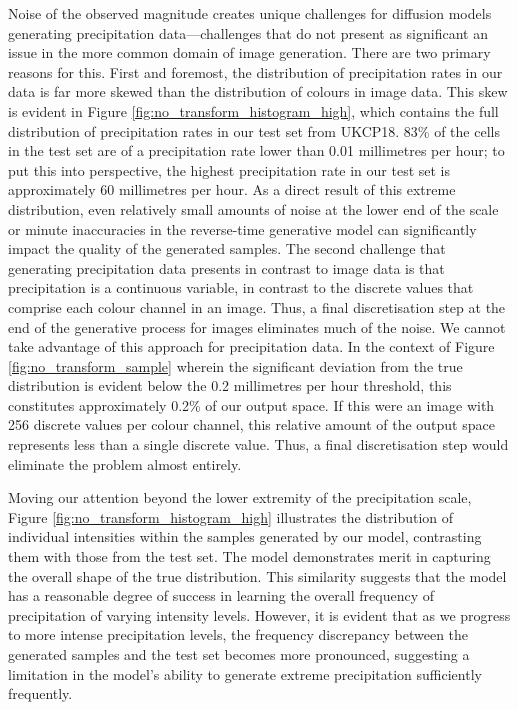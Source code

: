 \documentclass[ oneside,%
                    author={George Herbert},
                    degree={MSci},
                     title={Video Diffusion Models for Climate Simulations},
                  subtitle={}]{dissertation}
\begin{document}
Noise of the observed magnitude creates unique challenges for diffusion models generating precipitation data---challenges that do not present as significant an issue in the more common domain of image generation. There are two primary reasons for this. First and foremost, the distribution of precipitation rates in our data is far more skewed than the distribution of colours in image data. This skew is evident in Figure \ref{fig:no_transform_histogram_high}, which contains the full distribution of precipitation rates in our test set from UKCP18. 83\% of the cells in the test set are of a precipitation rate lower than 0.01 millimetres per hour; to put this into perspective, the highest precipitation rate in our test set is approximately 60 millimetres per hour. As a direct result of this extreme distribution, even relatively small amounts of noise at the lower end of the scale or minute inaccuracies in the reverse-time generative model can significantly impact the quality of the generated samples. The second challenge that generating precipitation data presents in contrast to image data is that precipitation is a continuous variable, in contrast to the discrete values that comprise each colour channel in an image. Thus, a final discretisation step at the end of the generative process for images eliminates much of the noise. We cannot take advantage of this approach for precipitation data. In the context of Figure \ref{fig:no_transform_sample} wherein the significant deviation from the true distribution is evident below the 0.2 millimetres per hour threshold, this constitutes approximately 0.2\% of our output space. If this were an image with 256 discrete values per colour channel, this relative amount of the output space represents less than a single discrete value. Thus, a final discretisation step would eliminate the problem almost entirely.

Moving our attention beyond the lower extremity of the precipitation scale, Figure \ref{fig:no_transform_histogram_high} illustrates the distribution of individual intensities within the samples generated by our model, contrasting them with those from the test set. The model demonstrates merit in capturing the overall shape of the true distribution. This similarity suggests that the model has a reasonable degree of success in learning the overall frequency of precipitation of varying intensity levels. However, it is evident that as we progress to more intense precipitation levels, the frequency discrepancy between the generated samples and the test set becomes more pronounced, suggesting a limitation in the model's ability to generate extreme precipitation sufficiently frequently.
\end{document}
